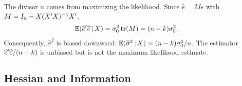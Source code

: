 \documentclass[a4paper,12pt]{article}
\begin{document}
\begin{remark}
	The divisor $n$ comes from maximizing the likelihood.
	Since $\widehat e=M e$ with $M=I_n-X(X^{\prime} X)^{-1} X^{\prime}$,
	\begin{align*}
		\operatorname{\mathbb{E}}(\widehat e^{\prime}\widehat e\mathpunct{}|\mathpunct{} X)
		=\sigma_0^2\operatorname{tr}(M)=(n-k)\sigma_0^2.
	\end{align*}
	Consequently, $\widehat\sigma^2$ is biased downward:
	$\operatorname{\mathbb{E}}(\widehat\sigma^2\mathpunct{}|\mathpunct{} X)=(n-k)\sigma_0^2/n$.
	The estimator $\widehat e^{\prime}\widehat e/(n-k)$ is unbiased but is not the maximum likelihood estimate.
\end{remark}

\subsection{Hessian and Information}
\end{document}

